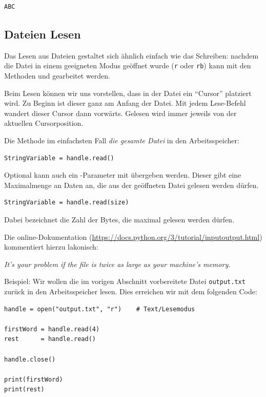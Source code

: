 \begin{cmdbox}
\begin{verbatim}
ABC
\end{verbatim}
\end{cmdbox}


\subsection{Dateien Lesen}
Das Lesen aus Dateien gestaltet sich ähnlich einfach wie das Schreiben: nachdem die Datei in einem geeigneten Modus geöffnet wurde (\texttt{r} oder \texttt{rb}) kann mit den Methoden  und  gearbeitet werden.

Beim Lesen können wir uns vorstellen, dass in der Datei ein \enquote{Cursor} platziert wird. Zu Beginn ist dieser ganz am Anfang der Datei. Mit jedem Lese-Befehl wandert dieser Cursor dann vorwärts. Gelesen wird immer jeweils von der aktuellen Cursorposition.

Die Methode  im einfachsten Fall \emph{die gesamte Datei} in den Arbeitsspeicher:
\begin{codebox}
\begin{verbatim}
StringVariable = handle.read()
\end{verbatim}
\end{codebox}

Optional kann auch ein -Parameter  mit übergeben werden. Dieser gibt eine Maximalmenge an Daten an, die aus der geöffneten Datei  gelesen werden dürfen. 
\begin{codebox}
\begin{verbatim}
StringVariable = handle.read(size)
\end{verbatim}
\end{codebox}
Dabei bezeichnet  die Zahl der Bytes, die maximal gelesen werden dürfen.

Die online-Dokumentation (\url{https://docs.python.org/3/tutorial/inputoutput.html}) kommentiert hierzu lakonisch:
\begin{center}
	\emph{It’s your problem if the file is twice as large as your machine’s memory.}
\end{center}

Beispiel: Wir wollen die im vorigen Abschnitt vorbereitete Datei \texttt{output.txt} zurück in den Arbeitsspeicher lesen. Dies erreichen wir mit dem folgenden Code:
\begin{codebox}
\begin{verbatim}
handle = open("output.txt", "r")    # Text/Lesemodus

firstWord = handle.read(4)
rest      = handle.read()

handle.close()

print(firstWord)
print(rest)
\end{verbatim}
\end{codebox}

